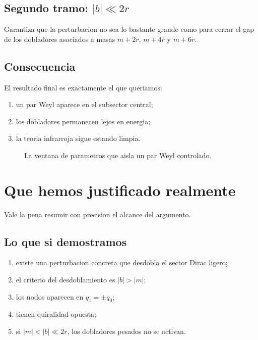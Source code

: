 \subsection{\texorpdfstring{Segundo tramo: \(|b|\ll 2r\)}{Segundo tramo: |b|<<2r}}
Garantiza que la perturbacion no sea lo bastante grande como para cerrar el gap de los dobladores asociados a masas \(m+2r\), \(m+4r\) y \(m+6r\).

\subsection{Consecuencia}
El resultado final es exactamente el que queriamos:
\begin{enumerate}[label=\arabic*.]
    \item un par Weyl aparece en el subsector central;
    \item los dobladores permanecen lejos en energia;
    \item la teoria infrarroja sigue estando limpia.
\end{enumerate}

\begin{figure}[h!]
\centering
{}
\caption{La ventana de parametros que aisla un par Weyl controlado.}
\end{figure}

\section{Que hemos justificado realmente}
Vale la pena resumir con precision el alcance del argumento.

\subsection*{Lo que si demostramos}
\begin{enumerate}[label=\arabic*.]
    \item existe una perturbacion concreta que desdobla el sector Dirac ligero;
    \item el criterio del desdoblamiento es \(|b|>|m|\);
    \item los nodos aparecen en \(q_z=\pm q_0\);
    \item tienen quiralidad opuesta;
    \item si \(|m|<|b|\ll 2r\), los dobladores pesados no se activan.
\end{enumerate}

